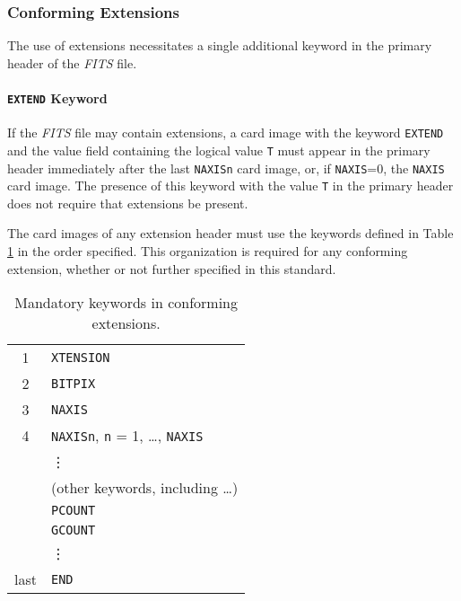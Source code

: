    \subsubsection{Conforming Extensions}

\label{s:conf}
  The use of
   extensions necessitates 
   a single additional keyword in the 
    primary header of the {\em FITS\/} file. 

   \paragraph{{\tt EXTEND} Keyword}
   \label{s:ext}
   If the {\em FITS\/} file may contain extensions, 
   a card image
   with the keyword {\tt EXTEND} and the value field containing the
   logical value {\tt T} must appear in the primary header
   immediately after the last {\tt NAXISn} 
   card image, or, if
   {\tt NAXIS}=0, the {\tt NAXIS} card image. 
   The presence of this keyword with the value {\tt T} in the 
   primary header does not require that extensions be present.

\bigskip

   The card images of any extension header must use the
   keywords defined in Table \ref{t:hdr2} 
   in the order
   specified.  This
   organization is required for any conforming extension,
   whether or not further specified in this standard.

\begin{table}[htpb]
 \begin{center}
   \begin{tabular}{cl}
       1      & {\tt XTENSION} \\
       2      & {\tt BITPIX} \\
       3      & {\tt NAXIS} \\
       4      & {\tt NAXISn}, {\tt n} = 1, \ldots, {\tt NAXIS} \\
              & \vdots \\
              & (other keywords, including \ldots ) \\
              & {\tt PCOUNT} \\
              & {\tt GCOUNT} \\
              & \vdots \\
       last   & {\tt END} \\
   \end{tabular}
 \end{center}
 \caption{Mandatory keywords in conforming extensions.}
 \label{t:hdr2}
\end{table}


